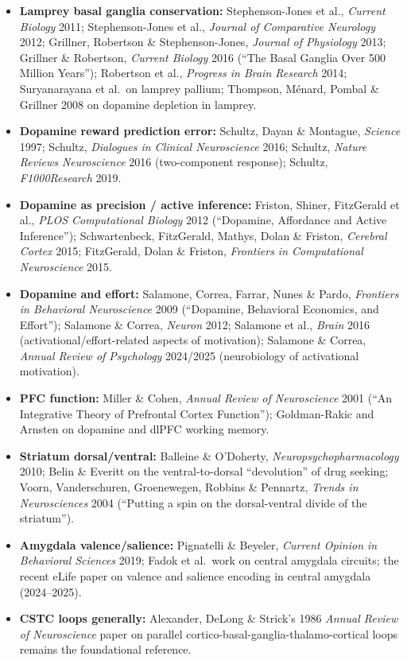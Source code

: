 \begin{itemize}
\tightlist
\item
  \textbf{Lamprey basal ganglia conservation:} Stephenson-Jones et al., \emph{Current Biology} 2011; Stephenson-Jones et al., \emph{Journal of Comparative Neurology} 2012; Grillner, Robertson \& Stephenson-Jones, \emph{Journal of Physiology} 2013; Grillner \& Robertson, \emph{Current Biology} 2016 (``The Basal Ganglia Over 500 Million Years''); Robertson et al., \emph{Progress in Brain Research} 2014; Suryanarayana et al.~on lamprey pallium; Thompson, Ménard, Pombal \& Grillner 2008 on dopamine depletion in lamprey.
\item
  \textbf{Dopamine reward prediction error:} Schultz, Dayan \& Montague, \emph{Science} 1997; Schultz, \emph{Dialogues in Clinical Neuroscience} 2016; Schultz, \emph{Nature Reviews Neuroscience} 2016 (two-component response); Schultz, \emph{F1000Research} 2019.
\item
  \textbf{Dopamine as precision / active inference:} Friston, Shiner, FitzGerald et al., \emph{PLOS Computational Biology} 2012 (``Dopamine, Affordance and Active Inference''); Schwartenbeck, FitzGerald, Mathys, Dolan \& Friston, \emph{Cerebral Cortex} 2015; FitzGerald, Dolan \& Friston, \emph{Frontiers in Computational Neuroscience} 2015.
\item
  \textbf{Dopamine and effort:} Salamone, Correa, Farrar, Nunes \& Pardo, \emph{Frontiers in Behavioral Neuroscience} 2009 (``Dopamine, Behavioral Economics, and Effort''); Salamone \& Correa, \emph{Neuron} 2012; Salamone et al., \emph{Brain} 2016 (activational/effort-related aspects of motivation); Salamone \& Correa, \emph{Annual Review of Psychology} 2024/2025 (neurobiology of activational motivation).
\item
  \textbf{PFC function:} Miller \& Cohen, \emph{Annual Review of Neuroscience} 2001 (``An Integrative Theory of Prefrontal Cortex Function''); Goldman-Rakic and Arnsten on dopamine and dlPFC working memory.
\item
  \textbf{Striatum dorsal/ventral:} Balleine \& O'Doherty, \emph{Neuropsychopharmacology} 2010; Belin \& Everitt on the ventral-to-dorsal ``devolution'' of drug seeking; Voorn, Vanderschuren, Groenewegen, Robbins \& Pennartz, \emph{Trends in Neurosciences} 2004 (``Putting a spin on the dorsal-ventral divide of the striatum'').
\item
  \textbf{Amygdala valence/salience:} Pignatelli \& Beyeler, \emph{Current Opinion in Behavioral Sciences} 2019; Fadok et al.~work on central amygdala circuits; the recent eLife paper on valence and salience encoding in central amygdala (2024--2025).
\item
  \textbf{CSTC loops generally:} Alexander, DeLong \& Strick's 1986 \emph{Annual Review of Neuroscience} paper on parallel cortico-basal-ganglia-thalamo-cortical loops remains the foundational reference.
\end{itemize}

